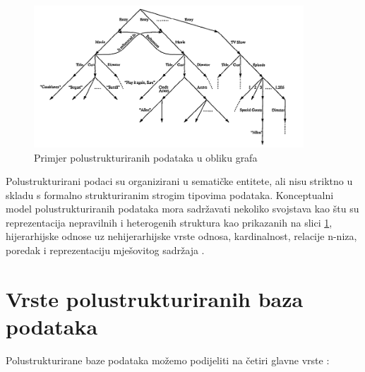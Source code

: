 \documentclass[]{foi}
\begin{document}
\begin{figure}[h!]
	\centering
	\includegraphics[width=0.9\textwidth]{slike/graf_primjer.png}
	\caption{Primjer polustrukturiranih podataka u obliku grafa \cite{buneman1997semistructured}}
	\label{fig:primjer_polustrukturiranih_podataka}
\end{figure}

Polustrukturirani podaci su organizirani u sematičke entitete, ali nisu striktno u skladu s formalno strukturiranim strogim tipovima podataka.
Konceptualni model polustrukturiranih podataka mora sadržavati nekoliko svojstava kao štu su reprezentacija nepravilnih i heterogenih struktura
kao prikazanih na slici \ref{fig:primjer_polustrukturiranih_podataka}, hijerarhijske odnose uz nehijerarhijske vrste odnosa, kardinalnost,
relacije n-niza, poredak i reprezentaciju mješovitog sadržaja \cite{ganguly2012evaluations}.

\section{Vrste polustrukturiranih baza podataka}

Polustrukturirane baze podataka možemo podijeliti na četiri glavne vrste \cite{abramova2013nosql}:
\end{document}
